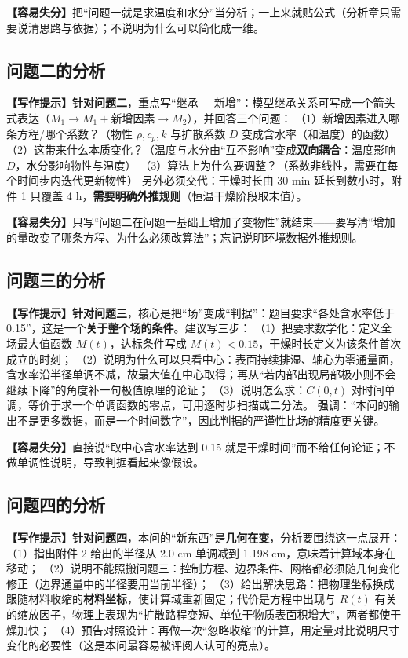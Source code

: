 \documentclass[12pt,a4paper]{article}
\newcommand{\prompt}[1]{\par\noindent\textbf{【写作提示】}#1\par}      %
\newcommand{\pitfall}[1]{\par\noindent\textbf{【容易失分】}#1\par}     %
\begin{document}
\pitfall{把“问题一就是求温度和水分”当分析；一上来就贴公式（分析章只需要说清思路与依据）；不说明为什么可以简化成一维。}

\subsection{问题二的分析}

\prompt{\textbf{针对问题二}，重点写“继承 + 新增”：模型继承关系可写成一个箭头式表达（$M_1 \rightarrow M_1+\text{新增因素} \rightarrow M_2$），并回答三个问题：
（1）新增因素进入哪条方程/哪个系数？（物性 $\rho,c_p,k$ 与扩散系数 $D$ 变成含水率（和温度）的函数）
（2）这带来什么本质变化？（温度与水分由“互不影响”变成\textbf{双向耦合}：温度影响 $D$，水分影响物性与温度）
（3）算法上为什么要调整？（系数非线性，需要在每个时间步内迭代更新物性）
另外必须交代：干燥时长由 30 min 延长到数小时，附件 1 只覆盖 4 h，\textbf{需要明确外推规则}（恒温干燥阶段取末值）。}

\pitfall{只写“问题二在问题一基础上增加了变物性”就结束——要写清“增加的量改变了哪条方程、为什么必须改算法”；忘记说明环境数据外推规则。}

\subsection{问题三的分析}

\prompt{\textbf{针对问题三}，核心是把“场”变成“判据”：题目要求“各处含水率低于 0.15”，这是一个\textbf{关于整个场的条件}。建议写三步：
（1）把要求数学化：定义全场最大值函数 $M(t)$，达标条件写成 $M(t)<0.15$，干燥时长定义为该条件首次成立的时刻；
（2）说明为什么可以只看中心：表面持续排湿、轴心为零通量面，含水率沿半径单调不减，故最大值在中心取得；再从“若内部出现局部极小则不会继续下降”的角度补一句极值原理的论证；
（3）说明怎么求：$C(0,t)$ 对时间单调，等价于求一个单调函数的零点，可用逐时步扫描或二分法。
强调：“本问的输出不是更多数据，而是一个时间数字”，因此判据的严谨性比场的精度更关键。}

\pitfall{直接说“取中心含水率达到 0.15 就是干燥时间”而不给任何论证；不做单调性说明，导致判据看起来像假设。}

\subsection{问题四的分析}

\prompt{\textbf{针对问题四}，本问的“新东西”是\textbf{几何在变}，分析要围绕这一点展开：
（1）指出附件 2 给出的半径从 2.0 cm 单调减到 1.198 cm，意味着计算域本身在移动；
（2）说明不能照搬问题三：控制方程、边界条件、网格都必须随几何变化修正（边界通量中的半径要用当前半径）；
（3）给出解决思路：把物理坐标换成跟随材料收缩的\textbf{材料坐标}，使计算域重新固定；代价是方程中出现与 $R(t)$ 有关的缩放因子，物理上表现为“扩散路程变短、单位干物质表面积增大”，两者都使干燥加快；
（4）预告对照设计：再做一次“忽略收缩”的计算，用定量对比说明尺寸变化的必要性（这是本问最容易被评阅人认可的亮点）。}
\end{document}
